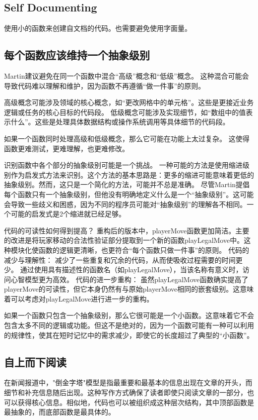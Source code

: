 \subsection{Self Documenting}
使用小的函数来创建自文档的代码。也需要避免使用字面量。

\subsection{每个函数应该维持一个抽象级别}
Martin建议避免在同一个函数中混合“高级”概念和“低级”概念。
这种混合可能会导致代码难以理解和维护，因为函数不再遵循“做一件事”的原则。

高级概念可能涉及领域的核心概念，如“更改网格中的单元格”。这些是更接近业务逻辑或任务的核心目标的代码段。
低级概念可能涉及实现细节，如“数组中的值表示什么”。这些是处理具体数据结构或操作系统调用等具体细节的代码段。

如果一个函数同时处理高级和低级概念，那么它可能在功能上太过复杂。
这使得函数更难测试，更难理解，也更难修改。

识别函数中各个部分的抽象级别可能是一个挑战。
一种可能的方法是使用缩进级别作为启发式方法来识别。这个方法的基本思路是：更多的缩进可能意味着更低的抽象级别。然而，这只是一个简化的方法，可能并不总是准确。
尽管Martin提倡每个函数只有一个抽象级别，但他没有明确地定义什么是一个“抽象级别”。这可能会导致一些歧义和困惑，因为不同的程序员可能对“抽象级别”的理解各不相同。一个可能的启发式是2个缩进就已经足够。

代码的可读性如何得到提高？
重构后的版本中，playerMove函数更加简洁。主要的改进是将玩家移动的合法性验证部分提取到一个新的函数playLegalMove中。这种模块化使函数的逻辑更清晰，也更符合“每个函数只做一件事”的原则。
代码的减少与理解性：
减少了一些重复和冗余的代码，从而使吸收过程需要的时间更少。
通过使用具有描述性的函数名（如playLegalMove），当该名称有意义时，访问心智模型更为高效。
代码的进一步重构：
虽然playLegalMove函数确实提高了playerMove的可读性，但它本身仍然有与原始playerMove相同的嵌套级别。这意味着可以考虑对playLegalMove进行进一步的重构。

如果一个函数只包含一个抽象级别，那么它很可能是一个小函数。这意味着它不会包含太多不同的逻辑或功能。但这不是绝对的，因为一个函数可能有一种可以利用的规律性，使其在短时记忆中的需求减少，即使它的长度超过了典型的“小函数”。

\subsection{自上而下阅读}
在新闻报道中，"倒金字塔"模型是指最重要和最基本的信息出现在文章的开头，而细节和补充信息随后出现。这种写作方式确保了读者即使只阅读文章的一部分，也可以获得核心信息。相似地，代码也可以被组织成这种层次结构，其中顶部函数是最抽象的，而底部函数是最具体的。

